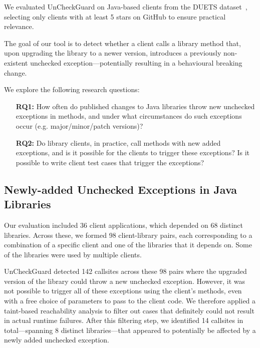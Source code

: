 
We evaluated UnCheckGuard on Java-based clients from the DUETS dataset~\cite{durieux21:_duets}, selecting only clients with at least 5 stars on GitHub to ensure practical relevance.

The goal of our tool is to detect whether a client calls a library method that, upon upgrading the library to a newer version, introduces a previously non-existent unchecked exception—potentially resulting in a behavioural breaking change.

We explore the following research questions:

\begin{itemize}
  \item[\textbf{RQ1:}] How often do published changes to Java libraries throw new unchecked exceptions in methods,
and under what circumstances do such exceptions occur (e.g. major/minor/patch versions)?
  \item[\textbf{RQ2:}]  Do library clients, in practice, call methods with new added exceptions, and is it possible for the clients to trigger these exceptions? Is it possible to write client test cases that trigger the exceptions?
\end{itemize}


\subsection{Newly-added Unchecked Exceptions in Java Libraries}

Our evaluation included 36 client applications, which depended on 68 distinct libraries. Across these, we formed 98 client-library pairs, each corresponding to a combination of a specific client and one of the libraries that it depends on. Some of the libraries were used by multiple clients.



UnCheckGuard detected 142 callsites across these 98 pairs where the upgraded version of the library could throw a new unchecked exception. However, it was not possible to trigger all of these exceptions using the client's methods, even with a free choice of parameters to pass to the client code. We therefore applied a taint-based reachability analysis to filter out cases that definitely could not result in actual runtime failures. After this filtering step, we identified 14 callsites in total—spanning 8 distinct libraries—that appeared to potentially be affected by a newly added unchecked exception. 

